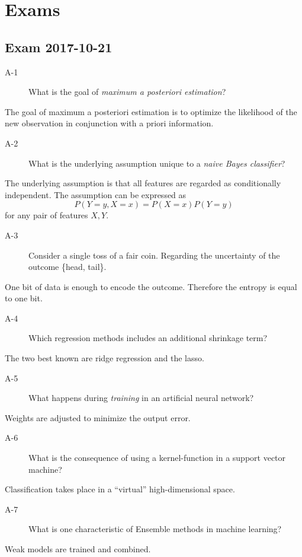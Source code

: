\documentclass[10pt,a4paper]{article}
\newenvironment{prob}[1]%
   {%
    \begin{description}\item[#1]}%
   {\end{description}}
\begin{document}
\section{Exams}

\subsection{Exam 2017-10-21}

\begin{prob}{A-1}
  What is the goal of \textit{maximum a posteriori estimation}?
\end{prob}
The goal of maximum a posteriori estimation is to optimize the
likelihood of the new observation in conjunction with a priori
information.

\begin{prob}{A-2}
  What is the underlying assumption unique to a \textit{naive Bayes
    classifier}?
\end{prob}
The underlying assumption is that all features are regarded as
conditionally independent. The assumption can be expressed as
\begin{equation}
  P(Y = y, X = x) = P(X = x)P(Y = y)
\end{equation}
for any pair of features $X, Y$.
\begin{prob}{A-3}
  Consider a single toss of a fair coin. Regarding the uncertainty of
  the outcome \{head, tail\}.
\end{prob}
One bit of data is enough to encode the outcome. Therefore the entropy
is equal to one bit.
\begin{prob}{A-4}
  Which regression methods includes an additional shrinkage term?
\end{prob}
The two best known are ridge regression and the lasso.
\begin{prob}{A-5}
  What happens during \textit{training} in an artificial neural
  network?
\end{prob}
Weights are adjusted to minimize the output error.
\begin{prob}{A-6}
  What is the consequence of using a kernel-function in a support
  vector machine?
\end{prob}
Classification takes place in a ``virtual'' high-dimensional space.
\begin{prob}{A-7}
  What is one characteristic of Ensemble methods in machine learning?
\end{prob}
Weak models are trained and combined.
\end{document}
